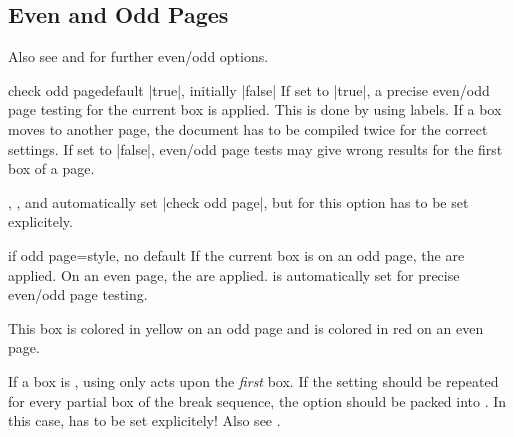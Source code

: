 \clearpage
\subsection{Even and Odd Pages}

\begin{marker}
Also see
 and
for further even/odd options.
\end{marker}

\begin{docTcbKey}[][doc updated=2015-11-13]{check odd page}{}{default |true|, initially |false|}
If set to |true|, a precise even/odd page testing for the current box
is applied. This is done by using labels. If a box moves to another page,
the document has to be compiled twice for the correct settings.
If set to |false|, even/odd page tests may give wrong results for the first box
of a page.

,
, and
automatically set |check odd page|, but for
 this option has to be set explicitely.
\end{docTcbKey}

\enlargethispage*{1cm}
\begin{docTcbKey}[][doc new=2015-11-13]{if odd page}{=}{style, no default}
If the current box is on an odd page, the  are applied.
On an even page, the  are applied.
 is automatically set for precise even/odd page testing.

\begin{dispExample}
\begin{tcolorbox}[if odd page={colback=yellow!50}{colback=red!50}]
  This box is colored in yellow on an odd page
  and is colored in red on an even page.
\end{tcolorbox}
\end{dispExample}

\begin{marker}
If a box is , using 
only acts upon the \emph{first} box. If the setting should be
repeated for every partial box of the break sequence, the option should be
packed into . In this case, 
has to be set explicitely! Also see .
\end{marker}
\end{docTcbKey}


